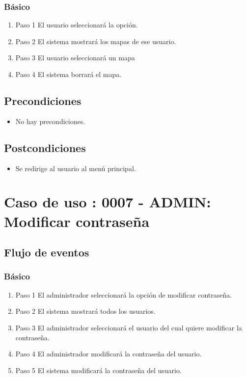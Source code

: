 \subsubsection{Básico}

\begin{enumerate}
\item Paso 1
El usuario seleccionará la opción.
\item Paso 2
El sistema mostrará los mapas de ese usuario.
\item Paso 3
El usuario seleccionará un mapa
\item Paso 4
El sistema borrará el mapa.
\end{enumerate}

\subsection{Precondiciones}
\begin{itemize}
\item No hay precondiciones.
\end{itemize}
\subsection{Postcondiciones}
\begin{itemize}
\item Se redirige al usuario al menú principal.
\end{itemize}



\section{Caso de uso : 0007 - ADMIN: Modificar contraseña}\label{sec:uc0}

\subsection{Flujo de eventos}

\subsubsection{Básico}

\begin{enumerate}
\item Paso 1
El administrador seleccionará la opción de modificar contraseña.
\item Paso 2
El sistema mostrará todos los usuarios.
\item Paso 3
El administrador seleccionará el usuario del cual quiere modificar la contraseña.
\item Paso 4
El administrador modificará la contraseña del usuario.
\item Paso 5
El sistema modificará la contraseña del usuario.

\end{enumerate}


